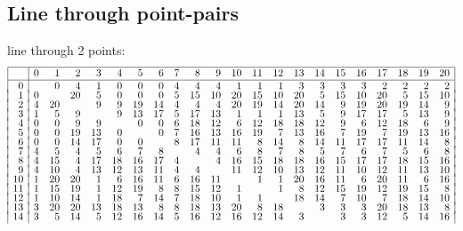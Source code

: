 {\subsection{Line through point-pairs}
line through 2 points:
$$
\begin{array}{|r|*{21}{r}|}
\hline
& 0
& 1
& 2
& 3
& 4
& 5
& 6
& 7
& 8
& 9
& 10
& 11
& 12
& 13
& 14
& 15
& 16
& 17
& 18
& 19
& 20
\\
\hline
0 &  & 0 & 4 & 1 & 0 & 0 & 0 & 4 & 4 & 4 & 1 & 1 & 1 & 3 & 3 & 3 & 3 & 2 & 2 & 2 & 2\\[-3pt]
1 & 0 &  & 20 & 5 & 0 & 0 & 0 & 5 & 15 & 10 & 20 & 15 & 10 & 20 & 5 & 15 & 10 & 20 & 5 & 15 & 10\\[-3pt]
2 & 4 & 20 &  & 9 & 9 & 19 & 14 & 4 & 4 & 4 & 20 & 19 & 14 & 20 & 14 & 9 & 19 & 20 & 19 & 14 & 9\\[-3pt]
3 & 1 & 5 & 9 &  & 9 & 13 & 17 & 5 & 17 & 13 & 1 & 1 & 1 & 13 & 5 & 9 & 17 & 17 & 5 & 13 & 9\\[-3pt]
4 & 0 & 0 & 9 & 9 &  & 0 & 0 & 6 & 18 & 12 & 6 & 12 & 18 & 18 & 12 & 9 & 6 & 12 & 18 & 6 & 9\\[-3pt]
5 & 0 & 0 & 19 & 13 & 0 &  & 0 & 7 & 16 & 13 & 16 & 19 & 7 & 13 & 16 & 7 & 19 & 7 & 19 & 13 & 16\\[-3pt]
6 & 0 & 0 & 14 & 17 & 0 & 0 &  & 8 & 17 & 11 & 11 & 8 & 14 & 8 & 14 & 11 & 17 & 17 & 11 & 14 & 8\\[-3pt]
7 & 4 & 5 & 4 & 5 & 6 & 7 & 8 &  & 4 & 4 & 6 & 8 & 7 & 8 & 5 & 7 & 6 & 7 & 5 & 6 & 8\\[-3pt]
8 & 4 & 15 & 4 & 17 & 18 & 16 & 17 & 4 &  & 4 & 16 & 15 & 18 & 18 & 16 & 15 & 17 & 17 & 18 & 15 & 16\\[-3pt]
9 & 4 & 10 & 4 & 13 & 12 & 13 & 11 & 4 & 4 &  & 11 & 12 & 10 & 13 & 12 & 11 & 10 & 12 & 11 & 13 & 10\\[-3pt]
10 & 1 & 20 & 20 & 1 & 6 & 16 & 11 & 6 & 16 & 11 &  & 1 & 1 & 20 & 16 & 11 & 6 & 20 & 11 & 6 & 16\\[-3pt]
11 & 1 & 15 & 19 & 1 & 12 & 19 & 8 & 8 & 15 & 12 & 1 &  & 1 & 8 & 12 & 15 & 19 & 12 & 19 & 15 & 8\\[-3pt]
12 & 1 & 10 & 14 & 1 & 18 & 7 & 14 & 7 & 18 & 10 & 1 & 1 &  & 18 & 14 & 7 & 10 & 7 & 18 & 14 & 10\\[-3pt]
13 & 3 & 20 & 20 & 13 & 18 & 13 & 8 & 8 & 18 & 13 & 20 & 8 & 18 &  & 3 & 3 & 3 & 20 & 18 & 13 & 8\\[-3pt]
14 & 3 & 5 & 14 & 5 & 12 & 16 & 14 & 5 & 16 & 12 & 16 & 12 & 14 & 3 &  & 3 & 3 & 12 & 5 & 14 & 16\\[-3pt]

\end{array}$$}
